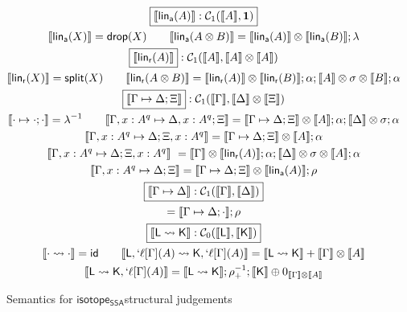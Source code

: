 \documentclass[acmsmall,screen,review]{acmart}
\newcommand{\mc}[1]{\ensuremath{\mathcal{#1}}}
\newcommand{\mb}[1]{\ensuremath{\mathbf{#1}}}
\newcommand{\ms}[1]{\ensuremath{\mathsf{#1}}}
\newcommand{\lbl}[1]{{`#1}}
\newcommand{\csplits}[3]{#1 \mapsto #2;#3}
\newcommand{\cwk}[2]{#1 \mapsto #2}
\newcommand{\lwk}[2]{#1 \rightsquigarrow #2}
\newcommand{\tlin}[2]{\ms{lin}_{#2}(#1)}
\newcommand{\thyp}[3]{#1: {#2}^{#3}}
\newcommand{\lhyp}[3]{#1[#2](#3)}
\newcommand{\llhyp}[3]{\lhyp{\lbl{#1}}{#2}{#3}}
\newcommand{\taff}{\ms{a}}
\newcommand{\trel}{\ms{r}}
\newcommand{\dnt}[1]{\llbracket{#1}\rrbracket}
\newcommand{\isotopessa}{\ms{isotope_{SSA}}}
\begin{document}
\begin{figure}
  \begin{gather*}
    \boxed{\dnt{\tlin{A}{\taff}}: \mc{C}_1(\dnt{A}, \mb{1})} \\
    \dnt{\tlin{X}{\taff}} = \ms{drop}(X) \qquad
    \dnt{\tlin{A \otimes B}{\taff}} 
      = \dnt{\tlin{A}{\taff}} \otimes \dnt{\tlin{B}{\taff}}
      ; \lambda \\
    \boxed{\dnt{\tlin{A}{\trel}}}
      : \mc{C}_1(\dnt{A}, \dnt{A} \otimes \dnt{A}) \\
    \dnt{\tlin{X}{\trel}} = \ms{split}(X) \qquad
    \dnt{\tlin{A \otimes B}{\trel}} = 
      \dnt{\tlin{A}{\trel}} \otimes \dnt{\tlin{B}{\trel}}
      ;\alpha;\dnt{A} \otimes \sigma \otimes \dnt{B};\alpha \\
    \boxed{\dnt{\csplits{\Gamma}{\Delta}{\Xi}}}
      : \mc{C}_1(\dnt{\Gamma}, \dnt{\Delta} \otimes \dnt{\Xi}) \\
    \dnt{\csplits{\cdot}{\cdot}{\cdot}} = \lambda^{-1} \qquad
    \dnt{\csplits
      {\Gamma, \thyp{x}{A}{q}}
      {\Delta, \thyp{x}{A}{q}}
      {\Xi}} 
      = \dnt{\csplits{\Gamma}{\Delta}{\Xi}} \otimes \dnt{A};\alpha;\dnt{\Delta} \otimes \sigma;\alpha \\
    \dnt{\csplits
      {\Gamma, \thyp{x}{A}{q}}
      {\Delta}
      {\Xi, \thyp{x}{A}{q}}} 
      = \dnt{\csplits{\Gamma}{\Delta}{\Xi}} \otimes \dnt{A};\alpha \\
    \dnt{\csplits
      {\Gamma, \thyp{x}{A}{q}}
      {\Delta}
      {\Xi, \thyp{x}{A}{q}}} \
      = \dnt{\Gamma} \otimes \dnt{\tlin{A}{\trel}};
        \alpha;
        \dnt{\Delta} \otimes \sigma \otimes \dnt{A};
        \alpha \\
    \dnt{\csplits
      {\Gamma, \thyp{x}{A}{q}}
      {\Delta}
      {\Xi}}
      = \dnt{\csplits{\Gamma}{\Delta}{\Xi}}
        \otimes \dnt{\tlin{A}{\taff}}
      ; \rho \\
    \boxed{\dnt{\cwk{\Gamma}{\Delta}}
      : \mc{C}_1(\dnt{\Gamma}, \dnt{\Delta})} \\
      = \dnt{\csplits{\Gamma}{\Delta}{\cdot}};\rho \\
    \boxed{\dnt{\lwk{\ms{L}}{\ms{K}}}
      : \mc{C}_0(\dnt{\ms{L}}, \dnt{\ms{K}})} \\
      \dnt{\lwk{\cdot}{\cdot}} = \ms{id} \qquad
      \dnt{\lwk
        {\ms{L}, \llhyp{\ell}{\Gamma}{A}}
        {\ms{K}, \llhyp{\ell}{\Gamma}{A}}}
        = \dnt{\lwk{\ms{L}}{\ms{K}}} + \dnt{\Gamma} \otimes \dnt{A} \\
      \dnt{\lwk{\ms{L}}{\ms{K}, \llhyp{\ell}{\Gamma}{A}}}
        = \dnt{\lwk{\ms{L}}{\ms{K}}};\rho_+^{-1}
        ; \dnt{\ms{K}} \oplus 0_{\dnt{\Gamma} \otimes \dnt{A}}
  \end{gather*}
  \caption{Semantics for \isotopessa structural judgements}
  \label{fig:ssa-structural-semantics}
\end{figure}
\end{document}
